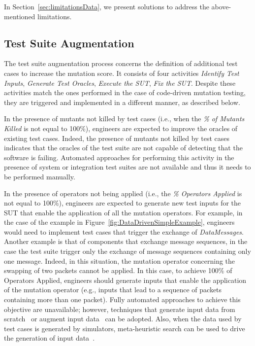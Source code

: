 In Section~\ref{sec:limitationsData}, we present solutions to address the above-mentioned limitations.


\subsection{Test Suite Augmentation} %
\label{sec:data:test_suite_augmentation}

The test suite augmentation process concerns the definition of additional test cases to increase the mutation score.
It consists of four activities \emph{Identify Test Inputs}, \emph{Generate Test Oracles}, \emph{Execute the SUT}, \emph{Fix the SUT}. 
Despite these activities match the ones performed in the case of code-driven mutation testing, they are triggered and implemented in a different manner, as described below.




In the presence of mutants not killed by test cases (i.e., when the \emph{\% of Mutants Killed} is not equal to 100\%), engineers are expected to improve the oracles of existing test cases. Indeed, the presence of mutants not killed by test cases indicates that the oracles of the test suite are not capable of detecting that the software is failing. 
Automated approaches for performing this activity in the presence of system or integration test suites are not available and thus it needs to be performed manually.

In the presence of operators not being applied (i.e., the \emph{\% Operators Applied} is not equal to 100\%), engineers are expected to generate new test inputs for the SUT that enable the application of all the mutation operators. 
For example, in the case of the example in Figure~\ref{fig:DataDrivenSimpleExample}, engineers would need to implement test cases that trigger the exchange of \emph{DataMessages}.
Another example is that of components that exchange message sequences, in the case the test suite trigger only the exchange of message sequences containing only one message. 
Indeed, in this situation, the mutation operator concerning the swapping of two packets cannot be applied. In this case, to achieve 100\% of Operators Applied, engineers should generate inputs that enable the application of the mutation operator (e.g., inputs that lead to a sequence of packets containing more than one packet). 
Fully automated approaches to achieve this objective are unavailable; however, techniques that generate input data from scratch~\cite{gligoric2010test} or augment input data~\cite{DiNardo:TOSEM:2017} can be adopted. 
Also, when the data used by test cases is generated by simulators, meta-heuristic search can be used to drive the generation of input data~\cite{Abdessalem:ICSE:2018}. 

